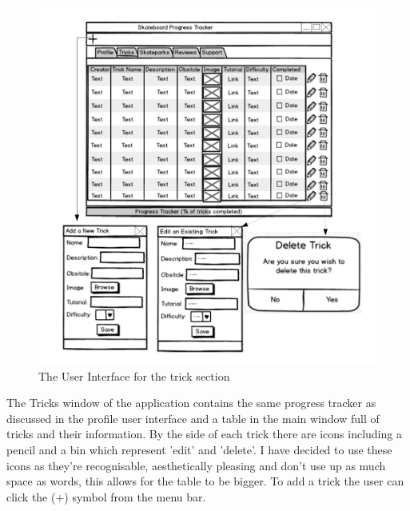 \begin{figure}[H]
    \includegraphics[width=\textwidth]{./Design/TrickUI.pdf}
    \caption{The User Interface for the trick section} \label{fig:Trick User Interface}
\end{figure}

The Tricks window of the application contains the same progress tracker as discussed in the profile user interface and a table in the main window full of tricks and their information. By the side of each trick there are icons including a pencil and a bin which represent 'edit' and 'delete'. I have decided to use these icons as they're recognisable, aesthetically pleasing and don't use up as much space as words, this allows for the table to be bigger. To add a trick the user can click the (+) symbol from the menu bar.


